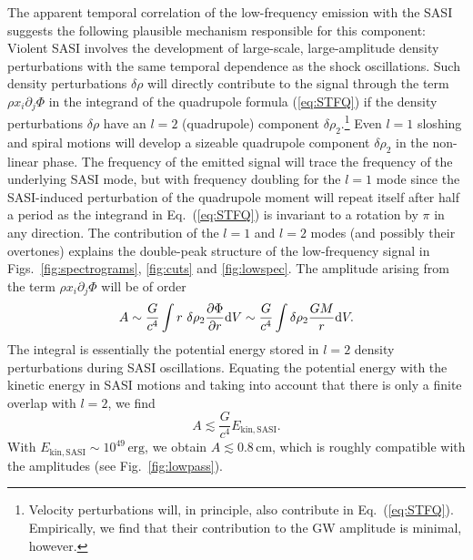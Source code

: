The apparent temporal correlation of the low-frequency emission
with the SASI suggests the following plausible mechanism responsible
for this component: Violent SASI involves the development
of large-scale, large-amplitude density perturbations with
the same temporal dependence as the shock oscillations. 
Such
density perturbations $\delta \rho$ will directly contribute
to the signal through the term
$\rho x_i \partial_j \Phi$ in the integrand
of the quadrupole formula (\ref{eq:STFQ}) if the density
perturbations  $\delta \rho$ have an $l=2$ (quadrupole) component
$\delta \rho_2$.\footnote{Velocity
perturbations will, in principle, also contribute in Eq.~(\ref{eq:STFQ}).
Empirically, we find that their contribution to the GW amplitude
is minimal, however.}
Even $l=1$ sloshing and spiral motions will develop
a sizeable quadrupole component $\delta \rho_2$ in the
non-linear phase. The frequency of the emitted signal will trace the frequency of the underlying
SASI mode, but with frequency doubling for the $l=1$ mode
since the SASI-induced perturbation of the quadrupole moment will repeat itself after half a period as
the integrand in Eq.~(\ref{eq:STFQ}) is invariant
to a rotation by $\pi$ in any direction.
The contribution of the $l=1$ and $l=2$ modes
(and possibly their overtones) explains the double-peak
structure of the low-frequency signal in Figs.~\ref{fig:spectrograms},
\ref{fig:cuts} and \ref{fig:lowspec}. The amplitude
arising from the term $\rho x_i \partial_j \Phi$ will be of order
\begin{equation}
A 
\sim 
 \frac{G}{c^4} \int r\ \delta {\rho_2} \frac{\partial \Phi}{\partial r} \mathrm{d} V
\sim
\frac{G}{c^4} \int \delta {\rho_2} \frac{G M}{r}  \mathrm{d} V.
\end{equation}
The integral is essentially the potential energy stored in
$l=2$ density perturbations during SASI oscillations. Equating the
potential energy
with the kinetic energy in SASI motions and taking into account that
there is only a finite overlap with $l=2$, we find
\begin{equation}
A 
\lesssim 
\frac{G}{c^4} E_\mathrm{kin,SASI}.
\end{equation}
With $E_\mathrm{kin,SASI} \sim 10^{49} \, \mathrm{erg}$, we
obtain $A \lesssim 0.8 \, \mathrm{cm}$, which is roughly compatible
with the amplitudes (see Fig.~\ref{fig:lowpass}).

